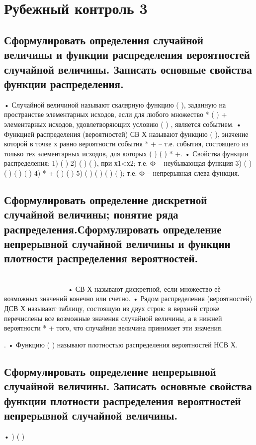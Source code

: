 \section{Рубежный контроль 3}

\subsection{Сформулировать определения случайной величины и функции распределения вероятностей случайной величины. Записать основные свойства функции распределения.}

• Случайной величиной называют скалярную функцию ( ), заданную на пространстве элементарных исходов, если для любого
множество * ( ) + элементарных исходов, удовлетворяющих условию ( ) , является событием.
• Функцией распределения (вероятностей) СВ Х называют функцию ( ), значение которой в точке х равно вероятности события * + –
т.е. события, состоящего из только тех элементарных исходов, для которых ( ) ( ) * +.
• Свойства функции распределения:
1) ( )
2) (
) (
), при х1<х2; т.е. Ф – неубывающая функция
3) ( ) ( ) ( ) ( )
4) *
+ (
) (
)
5) ( ) ( ) ( ) ( ); т.е. Ф – непрерывная слева функция.

\subsection{Сформулировать определение дискретной случайной величины; понятие ряда распределения.Сформулировать определение непрерывной случайной величины и функции плотности распределения вероятностей.}

~~~ ~~~ ~~~ ~~~ ~~~ ~~~ ~~~ ~~~ ~~~ ~~~ ~~~ ~~~ ~~~ ~~~ ~~~ ~~~ ~~~ ~~~ ~~~ ~~~ ~~~ ~~~ ~~~ ~~~
• СВ Х называют дискретной, если множество еѐ возможных значений конечно или счетно.
• Рядом распределения (вероятностей) ДСВ Х называют таблицу, состоящую из двух строк: в верхней строке перечислены все возможные
значения случайной величины, а в нижней вероятности *
+ того, что случайная величина принимает эти значения.


.
• Функцию ( ) называют плотностью распределения вероятностей НСВ Х.

\subsection{Сформулировать определение непрерывной случайной величины. Записать основные свойства функции плотности распределения вероятностей непрерывной случайной величины.}

• ) ( )



